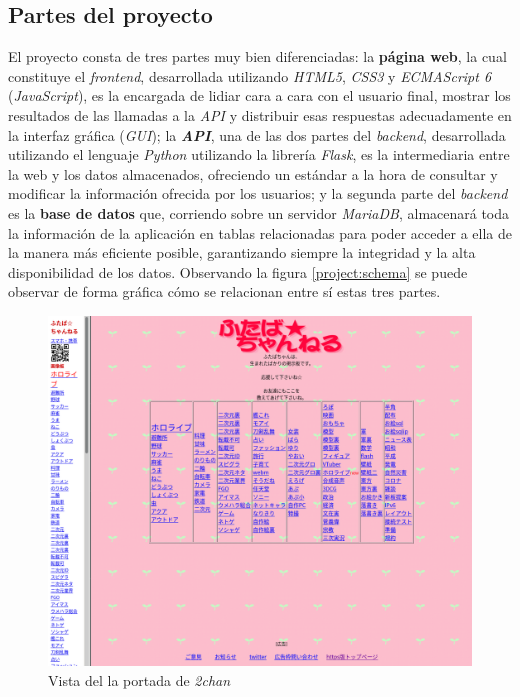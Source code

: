 \documentclass[12pt,a4paper,titlepage]{article}
\begin{document}
    \subsection{Partes del proyecto}

    El proyecto consta de tres partes muy bien diferenciadas: la \textbf{página web}, la cual constituye el \textit{frontend}, desarrollada utilizando \emph{HTML5}, \emph{CSS3} y \emph{ECMAScript 6} (\emph{JavaScript}), es la encargada de lidiar cara a cara con el usuario final, mostrar los resultados de las llamadas a la \emph{API} y distribuir esas respuestas adecuadamente en la interfaz gráfica (\emph{GUI}); la \emph{\textbf{API}}, una de las dos partes del \textit{backend}, desarrollada utilizando el lenguaje \emph{Python} utilizando la librería \textit{Flask}, es la intermediaria entre la web y los datos almacenados, ofreciendo un estándar a la hora de consultar y modificar la información ofrecida por los usuarios; y la segunda parte del \textit{backend} es la \textbf{base de datos} que, corriendo sobre un servidor \emph{MariaDB}, almacenará toda la información de la aplicación en tablas relacionadas para poder acceder a ella de la manera más eficiente posible, garantizando siempre la integridad y la alta disponibilidad de los datos. Observando la figura \ref{project:schema} se puede observar de forma gráfica cómo se relacionan entre sí estas tres partes.

    \begin{figure}[ht]
        \centering
        \caption{Vista del la portada de \textit{2chan}}\bigskip
        \label{2chan:home}
        \includegraphics[width=1.0\textwidth]{media/2chan-home.png}
    \end{figure}
\end{document}
